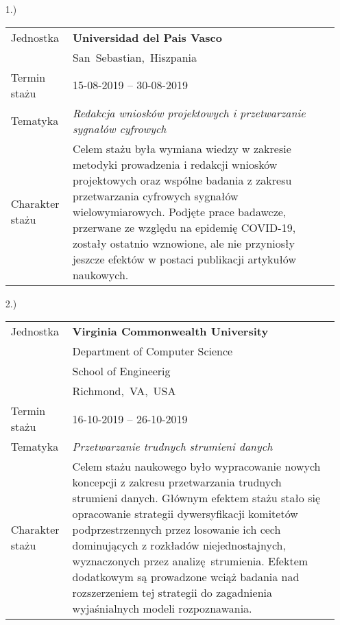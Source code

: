 \begin{itemize}
			\item[1.)]~\\
			\begin{tabular}{p{7em}p{20em}}
				Jednostka & \textbf{Universidad del Pais Vasco}\\
				& San~Sebastian,~Hiszpania\\
				Termin stażu & 15-08-2019 -- 30-08-2019\\
				Tematyka & \emph{Redakcja wniosków projektowych i przetwarzanie sygnałów cyfrowych}\\
				Charakter stażu & Celem stażu była wymiana wiedzy w zakresie metodyki prowadzenia i redakcji wniosków projektowych oraz wspólne badania z zakresu przetwarzania cyfrowych sygnałów wielowymiarowych. Podjęte prace badawcze, przerwane ze względu na epidemię COVID-19, zostały ostatnio wznowione, ale nie przyniosły jeszcze efektów w postaci publikacji artykułów naukowych. \\
			\end{tabular}\newpage
			\item[2.)]~\\
			\begin{tabular}{p{7em}p{20em}}
				Jednostka & \textbf{Virginia Commonwealth University}\\
				& Department of Computer Science\\
				& School of Engineerig\\
				& Richmond,~VA,~USA\\
				Termin stażu & 16-10-2019 -- 26-10-2019\\
				Tematyka & \emph{Przetwarzanie trudnych strumieni danych}\\
				Charakter stażu & Celem stażu naukowego było wypracowanie nowych koncepcji z zakresu przetwarzania trudnych strumieni danych. Głównym efektem stażu stało się opracowanie strategii dywersyfikacji komitetów podprzestrzennych przez losowanie ich cech dominujących z rozkładów niejednostajnych, wyznaczonych przez analizę strumienia. Efektem dodatkowym są prowadzone wciąż badania nad rozszerzeniem tej strategii do zagadnienia wyjaśnialnych modeli rozpoznawania.\\
				

\end{tabular}
\end{itemize}
